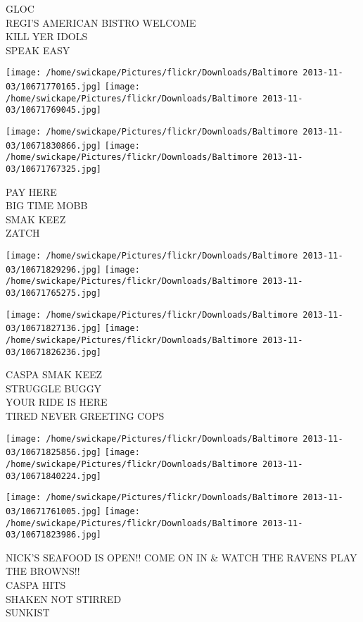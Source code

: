 \documentclass[10pt,letterpaper]{article}
\begin{document}
GLOC\\
REGI'S AMERICAN BISTRO WELCOME\\
KILL YER IDOLS\\
SPEAK EASY\\
\pagebreak

\texttt{[image: /home/swickape/Pictures/flickr/Downloads/Baltimore 2013-11-03/10671770165.jpg]}
\texttt{[image: /home/swickape/Pictures/flickr/Downloads/Baltimore 2013-11-03/10671769045.jpg]}

\texttt{[image: /home/swickape/Pictures/flickr/Downloads/Baltimore 2013-11-03/10671830866.jpg]}
\texttt{[image: /home/swickape/Pictures/flickr/Downloads/Baltimore 2013-11-03/10671767325.jpg]}

PAY HERE\\
BIG TIME MOBB\\
SMAK KEEZ\\
ZATCH\\
\pagebreak

\texttt{[image: /home/swickape/Pictures/flickr/Downloads/Baltimore 2013-11-03/10671829296.jpg]}
\texttt{[image: /home/swickape/Pictures/flickr/Downloads/Baltimore 2013-11-03/10671765275.jpg]}

\texttt{[image: /home/swickape/Pictures/flickr/Downloads/Baltimore 2013-11-03/10671827136.jpg]}
\texttt{[image: /home/swickape/Pictures/flickr/Downloads/Baltimore 2013-11-03/10671826236.jpg]}

CASPA SMAK KEEZ\\
STRUGGLE BUGGY\\
YOUR RIDE IS HERE\\
TIRED NEVER GREETING COPS\\
\pagebreak

\texttt{[image: /home/swickape/Pictures/flickr/Downloads/Baltimore 2013-11-03/10671825856.jpg]}
\texttt{[image: /home/swickape/Pictures/flickr/Downloads/Baltimore 2013-11-03/10671840224.jpg]}

\texttt{[image: /home/swickape/Pictures/flickr/Downloads/Baltimore 2013-11-03/10671761005.jpg]}
\texttt{[image: /home/swickape/Pictures/flickr/Downloads/Baltimore 2013-11-03/10671823986.jpg]}

NICK'S SEAFOOD IS OPEN!! COME ON IN \& WATCH THE RAVENS PLAY THE BROWNS!!\\
CASPA HITS\\
SHAKEN NOT STIRRED\\
SUNKIST\\
\pagebreak
\end{document}
